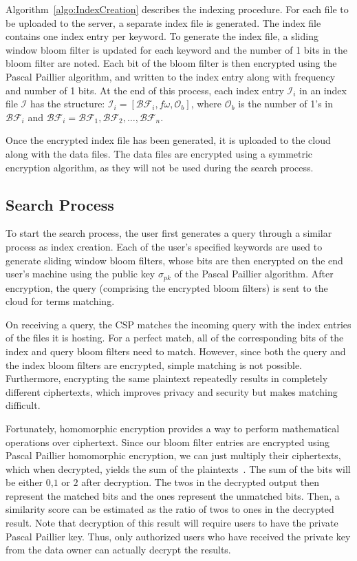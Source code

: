 Algorithm~\ref{algo:IndexCreation} describes the indexing procedure.
For each file to be uploaded to the server, a separate index file is generated. The index
file contains one index entry per keyword. To generate the index file, a sliding window bloom
filter is updated for each keyword and the number of 1 bits in the bloom filter are noted.
Each bit of the bloom filter is then encrypted using the Pascal Paillier algorithm, and written to 
the index entry along with frequency and number of 1 bits.
At the end of this process, each index entry $\mathcal{I}_i$ in an index file $\mathcal{I}$ has
the structure: 
$
\mathcal{I}_i = [\mathcal{BF}_i, f\omega,\mathcal{O}_b]
$,
where $\mathcal{O}_b$ is the number of 1's in 
$\mathcal{BF}_i$ and 
$\mathcal{BF}_i= \mathcal{BF}_1,\mathcal{BF}_2, \ldots ,\mathcal{BF}_n$.

Once the encrypted index file has been generated, it is uploaded to the cloud along with the data files.
The data files are encrypted using a symmetric encryption algorithm, as they will not be used during the
search process.

\subsection{Search Process}

To start the search process, the user first generates a query through a similar process as index creation. 
Each of the user's specified keywords are used to generate sliding window bloom filters, whose bits are then
encrypted on the end user's machine using the public key $\sigma_{pk}$ of the Pascal Paillier algorithm. 
After encryption, 
the query (comprising the encrypted bloom filters) is sent to the cloud for terms matching.

On receiving a query, the CSP matches the incoming query with the index entries of 
the files it is hosting. For a perfect match, all of the corresponding bits of the index 
and query bloom filters need to match. However, since both the query and the index
bloom filters are encrypted, simple matching is not possible. Furthermore, encrypting the
same plaintext repeatedly results in completely different ciphertexts, which improves
privacy and security but makes matching difficult.

Fortunately, homomorphic encryption provides a way to perform mathematical operations 
over ciphertext. Since our bloom filter entries are encrypted using Pascal Paillier homomorphic
encryption, we can just multiply their ciphertexts, which when decrypted, yields the sum of
the plaintexts~\cite{pascal}. The sum of the bits will be either $0$,$1$ or $2$ after decryption.
The twos in the decrypted output then represent the matched
bits and the ones represent the unmatched bits. Then, a similarity score
can be estimated as the ratio of twos to ones in the decrypted result.
Note that decryption of this result will require users to have the private Pascal 
Paillier key. Thus, only authorized users who have received the private key from the
data owner can actually decrypt the results.

